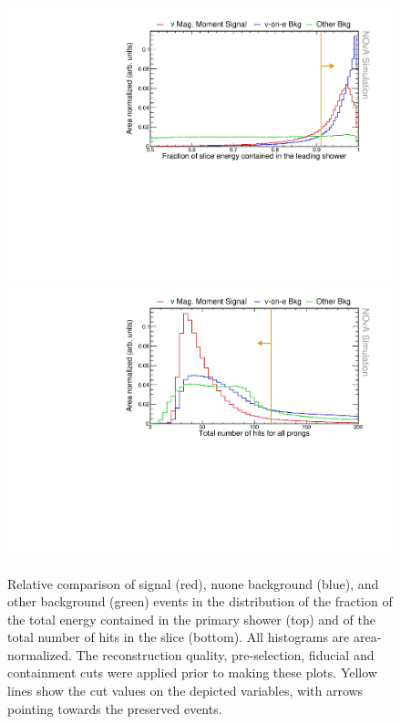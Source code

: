 \begin{figure}[hbtp]
\centering
\includegraphics[width=.9\textwidth]{Plots/NuMMEventSelection/N1Cut_shwEFrac.pdf}
\includegraphics[width=.9\textwidth]{Plots/NuMMEventSelection/N1Cut_NHitsPre.pdf}
\caption[Shower E fraction and number of hits cuts]{Relative comparison of signal (red), \acrshort{nuone} background (blue), and other background (green) events in the distribution of the fraction of the total energy contained in the primary shower (top) and of the total number of hits in the slice (bottom). All histograms are area-normalized. The reconstruction quality, pre-selection, fiducial and containment cuts were applied prior to making these plots. Yellow lines show the cut values on the depicted variables, with arrows pointing towards the preserved events.}
\label{fig:NuMMCutsTMVA1}
\end{figure}

